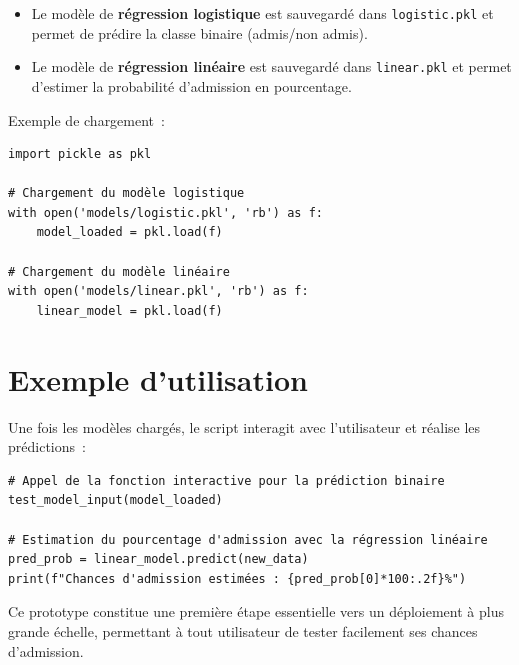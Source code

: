 \begin{itemize}
    \item Le modèle de \textbf{régression logistique} est sauvegardé dans \texttt{logistic.pkl} et permet de prédire la classe binaire (admis/non admis).
    \item Le modèle de \textbf{régression linéaire} est sauvegardé dans \texttt{linear.pkl} et permet d’estimer la probabilité d’admission en pourcentage.
\end{itemize}

Exemple de chargement :

\begin{verbatim}
import pickle as pkl

# Chargement du modèle logistique
with open('models/logistic.pkl', 'rb') as f:
    model_loaded = pkl.load(f)

# Chargement du modèle linéaire
with open('models/linear.pkl', 'rb') as f:
    linear_model = pkl.load(f)
\end{verbatim}

\section{Exemple d'utilisation}
Une fois les modèles chargés, le script interagit avec l'utilisateur et réalise les prédictions :

\begin{verbatim}
# Appel de la fonction interactive pour la prédiction binaire
test_model_input(model_loaded)

# Estimation du pourcentage d'admission avec la régression linéaire
pred_prob = linear_model.predict(new_data)
print(f"Chances d'admission estimées : {pred_prob[0]*100:.2f}%")
\end{verbatim}

Ce prototype constitue une première étape essentielle vers un déploiement à plus grande échelle, permettant à tout utilisateur de tester facilement ses chances d’admission.
